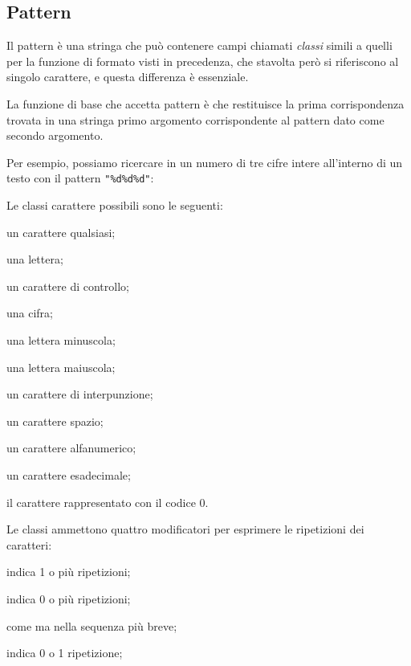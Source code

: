 \subsection{Pattern}
\label{secFondPattern}

Il pattern è una stringa che può contenere campi chiamati \emph{classi} simili
a quelli per la funzione di formato visti in precedenza, che stavolta però si
riferiscono al singolo carattere, e questa differenza è essenziale.

La funzione di base che accetta pattern è 
che restituisce la prima corrispondenza trovata in una stringa primo argomento
corrispondente al pattern dato come secondo argomento.

Per esempio, possiamo ricercare in un numero di tre cifre intere all'interno di
un testo con il pattern \verb|"%d%d%d"|:

Le classi carattere possibili sono le seguenti:
\begin{compactdescription}
  \item[\key{.}] un carattere qualsiasi;
  \item[\key{\%a}] una lettera;
  \item[\key{\%c}] un carattere di controllo;
  \item[\key{\%d}] una cifra;
  \item[\key{\%l}] una lettera minuscola;
  \item[\key{\%u}] una lettera maiuscola;
  \item[\key{\%p}] un carattere di interpunzione;
  \item[\key{\%s}] un carattere spazio;
  \item[\key{\%w}] un carattere alfanumerico;
  \item[\key{\%x}] un carattere esadecimale;
  \item[\key{\%z}] il carattere rappresentato con il codice 0.
\end{compactdescription}

Le classi ammettono quattro modificatori per esprimere le ripetizioni dei
caratteri:
\begin{compactdescription}
  \item[\key{+}] indica 1 o più ripetizioni;
  \item[\key{*}] indica 0 o più ripetizioni;
  \item[\key{-}] come \key{*} ma nella sequenza più breve;
  \item[\key{?}] indica 0 o 1 ripetizione;
\end{compactdescription}

